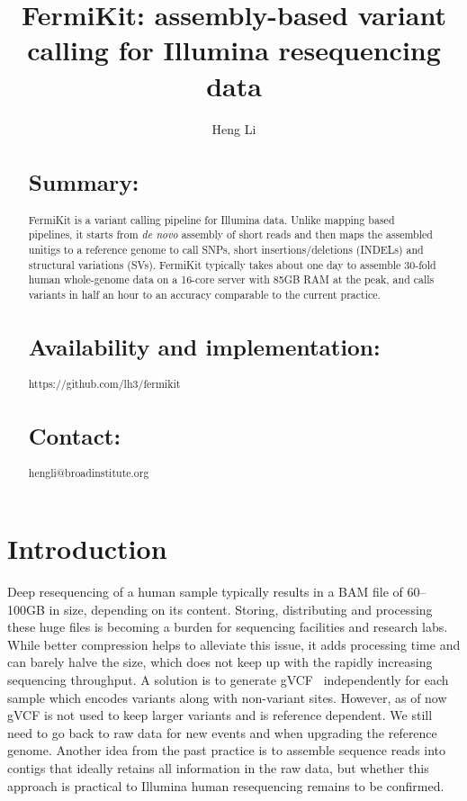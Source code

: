 \documentclass{bioinfo}
\begin{document}

\title[FermiKit: assembly based variant calling]{FermiKit: assembly-based variant calling for Illumina resequencing data}

\author[Li]{Heng Li}

\address{Broad Institute, 75 Ames Street, Cambridge, MA 02142, USA}

\maketitle

\begin{abstract}
\section{Summary:}
FermiKit is a variant calling pipeline for Illumina data. Unlike mapping based
pipelines, it starts from {\it de novo} assembly of short reads and then
maps the assembled unitigs to a reference genome to call SNPs, short
insertions/deletions (INDELs) and structural variations (SVs). FermiKit
typically takes about one day to assemble 30-fold human whole-genome data on a
16-core server with 85GB RAM at the peak, and calls variants in half an hour to
an accuracy comparable to the current practice.

\section{Availability and implementation:} https://github.com/lh3/fermikit

\section{Contact:} hengli@broadinstitute.org
\end{abstract}

\section{Introduction}
Deep resequencing of a human sample typically results in a BAM file of
60--100GB in size, depending on its content. Storing, distributing and
processing these huge files is becoming a burden for sequencing facilities and
research labs. While better compression helps to alleviate this issue, it
adds processing time and can barely halve the size, which does not keep up with
the rapidly increasing sequencing throughput. A solution is to generate
gVCF~\citep{Raczy:2013aa} independently for each sample which encodes variants
along with non-variant sites. However, as of now gVCF is not used to keep
larger variants and is reference dependent. We still need to go back to raw
data for new events and when upgrading the reference genome. Another idea from
the past practice is to assemble sequence reads into contigs that ideally
retains all information in the raw data, but whether this approach is practical
to Illumina human resequencing remains to be confirmed.
\end{document}
